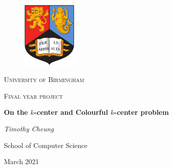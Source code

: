 \begin{titlepage}
    \setlength\headheight{100pt}
    \begin{center}
        \begin{figure}[h!]
            \centering
            \includegraphics[width=0.25\textwidth]{images/uob.png}
        \end{figure}
        
        \vspace{0.25cm}
            {\scshape\LARGE University of Birmingham \par}
            \vspace{0.25cm}
            {\scshape\Large Final year project\par}
        \vspace{0.5cm}
        
        \centering
        \Large{\textbf{On the $k$-center and Colourful $k$-center problem}}
        
        \vspace{1cm}
        \Large{\textit{Timothy Cheung}}
        
        \normalsize{School of Computer Science}
        
        \vspace{1cm}
        \large{March 2021}
    \end{center}
\end{titlepage}
\newpage